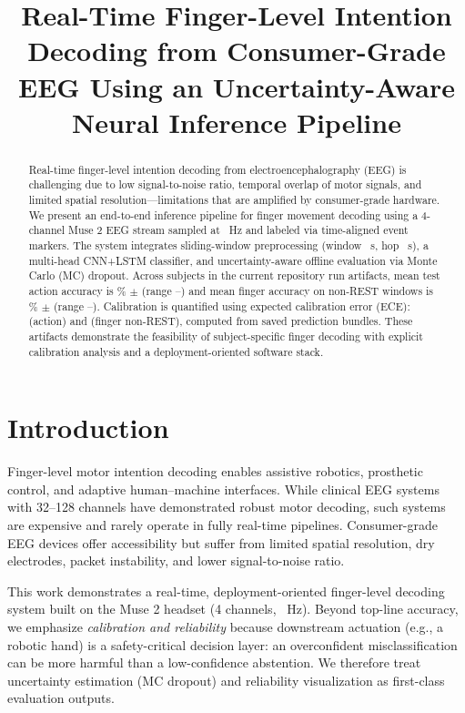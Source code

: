 \documentclass[conference]{IEEEtran}
\title{
Real-Time Finger-Level Intention Decoding from Consumer-Grade EEG
Using an Uncertainty-Aware Neural Inference Pipeline
}
\author{
\IEEEauthorblockN{Jonathan Davanzo et al.}
\IEEEauthorblockA{
AlphaHand Research Initiative\\
Email: jonathandavanzo@alphahand.org}
}
\begin{document}
\maketitle

\begin{abstract}
Real-time finger-level intention decoding from electroencephalography (EEG) is challenging due to low signal-to-noise ratio, temporal overlap of motor signals, and limited spatial resolution---limitations that are amplified by consumer-grade hardware. We present an end-to-end inference pipeline for finger movement decoding using a 4-channel Muse 2 EEG stream sampled at \TargetFsHz~Hz and labeled via time-aligned event markers. The system integrates sliding-window preprocessing (window \WindowSec~s, hop \HopSec~s), a multi-head CNN+LSTM classifier, and uncertainty-aware offline evaluation via Monte Carlo (MC) dropout. Across \NumSubjects subjects in the current repository run artifacts, mean test action accuracy is \ActionAccMean\% $\pm$ \ActionAccSD (range \ActionAccMin--\ActionAccMax) and mean finger accuracy on non-REST windows is \FingerAccMean\% $\pm$ \FingerAccSD (range \FingerAccMin--\FingerAccMax). Calibration is quantified using expected calibration error (ECE): \ActionECEMean (action) and \FingerECEMean (finger non-REST), computed from saved prediction bundles. These artifacts demonstrate the feasibility of subject-specific finger decoding with explicit calibration analysis and a deployment-oriented software stack.
\end{abstract}

\section{Introduction}

Finger-level motor intention decoding enables assistive robotics, prosthetic control, and adaptive human–machine interfaces. While clinical EEG systems with 32–128 channels have demonstrated robust motor decoding, such systems are expensive and rarely operate in fully real-time pipelines. Consumer-grade EEG devices offer accessibility but suffer from limited spatial resolution, dry electrodes, packet instability, and lower signal-to-noise ratio.

This work demonstrates a real-time, deployment-oriented finger-level decoding system built on the Muse 2 headset (4 channels, \TargetFsHz~Hz). Beyond top-line accuracy, we emphasize \emph{calibration and reliability} because downstream actuation (e.g., a robotic hand) is a safety-critical decision layer: an overconfident misclassification can be more harmful than a low-confidence abstention. We therefore treat uncertainty estimation (MC dropout) and reliability visualization as first-class evaluation outputs.
\end{document}
